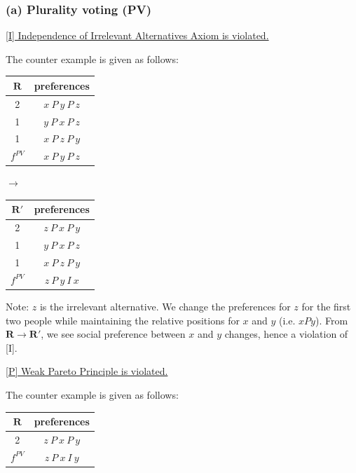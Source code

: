 \documentclass[a4paper]{article}
\begin{document}
\subsubsection*{(a) Plurality voting (PV)}

\underline{[I] Independence of Irrelevant Alternatives Axiom is violated. }

The counter example is given as follows:

\begin{table}[!htbp]
    \centering
    \begin{tabular}{c|c|}
        $\mathbf{R}$ & preferences         \\ 
        \hline
        2  & $x\: P\: y\: P\: z$ \\
        1  & $y\: P\: x\: P\: z$ \\
        1  & $x\: P\: z\: P\: y$ \\
        \hline 
        $f^{PV}$ & $x\: P\: y\: P\: z$
    \end{tabular}
    \qquad $\to$ \qquad
    \centering
    \begin{tabular}{c|c|}
        $\mathbf{R'}$ & preferences         \\ 
        \hline
        2  & $z\: P\: x\: P\: y$ \\
        1  & $y\: P\: x\: P\: z$ \\
        1  & $x\: P\: z\: P\: y$ \\
        \hline 
        $f^{PV}$ & $z\: P\: y\: I\: x$
    \end{tabular}
\end{table}

Note: $z$ is the irrelevant alternative. We change the preferences for $z$ for the first two people while maintaining the relative positions for $x$ and $y$ (i.e. $xPy$). From $\mathbf{R}\to\mathbf{R'}$, we see social preference between $x$ and $y$ changes, hence a violation of [I].

\underline{[P] Weak Pareto Principle is violated. }

The counter example is given as follows:

\begin{table}[!htbp]
    \centering
    \begin{tabular}{c|c|}
        $\mathbf{R}$ & preferences         \\ 
        \hline
        2  & $z\: P\: x\: P\: y$ \\
        \hline 
        $f^{PV}$ & $z\: P\: x\: I\: y$
    \end{tabular}
\end{table}
\end{document}
